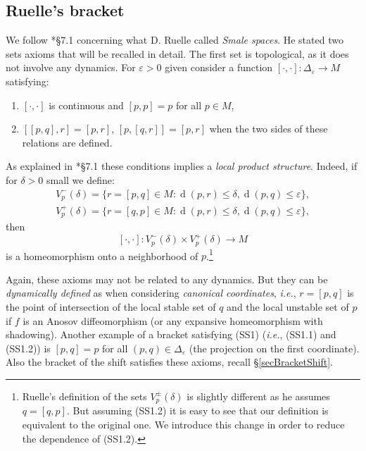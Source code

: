 \documentclass[12pt]{amsart}
\theoremstyle{plain}
\theoremstyle{definition}
\theoremstyle{remark}
\DeclareMathOperator{\dist}{d}
\renewcommand{\epsilon}{\varepsilon}
\begin{document}
\subsection{Ruelle's bracket}
\label{secRuelle's bracket}
We follow \cite{Ruelle}*{\S 7.1} concerning what D. Ruelle called \textit{Smale spaces}. He stated two sets axioms that will be recalled in detail. The first set is topological, as it does not involve any dynamics.
For $\epsilon>0$ given consider a function
$[\cdot,\cdot]\colon\Delta_\epsilon\to M$ satisfying:
\begin{enumerate}
	\item[(SS1.1)] $[\cdot,\cdot]$ is continuous and $[p,p]=p$ for all $p\in M$,
	\item[(SS1.2)] $[[p,q],r]=[p,r]$, $[p,[q,r]]=[p,r]$ when the two sides of these relations are defined.
\end{enumerate}

As explained in \cite{Ruelle}*{\S 7.1} these conditions implies a \textit{local product structure}. Indeed, if for $\delta>0$ small we define:
\begin{align*}
	V^-_p(\delta)=\{r=[p,q]\in M : \dist(p,r)\leq\delta, \dist(p,q)\leq\epsilon\},\\
	V^+_p(\delta)=\{r=[q,p]\in M : \dist(p,r)\leq\delta, \dist(p,q)\leq\epsilon\},
\end{align*}
then
\[
[\cdot,\cdot]\colon V^-_p(\delta)\times V^+_p(\delta)\to M
\]
is a homeomorphism onto a neighborhood of $p$.\footnote{Ruelle's definition of the sets $V^\pm_p(\delta)$ is slightly different as he assumes $q=[q,p]$. But assuming (SS1.2) it is easy to see that our definition is equivalent to the original one. We introduce this change in order to reduce the dependence of (SS1.2).}

Again, these axioms may not be related to any dynamics. But they can be \textit{dynamically defined} as when considering \textit{canonical coordinates}, \textit{i.e.}, $r=[p,q]$ is the point of intersection of the local stable set of $q$ and the local unstable set of $p$ if $f$ is an Anosov diffeomorphism (or any expansive homeomorphism with shadowing).
Another example of a bracket satisfying (SS1) (\textit{i.e.}, (SS1.1) and (SS1.2)) is $[p,q]=p$ for all $(p,q)\in \Delta_\epsilon$ (the projection on the first coordinate).
Also the bracket of the shift satisfies these axioms, recall \S\ref{secBracketShift}.
\end{document}

